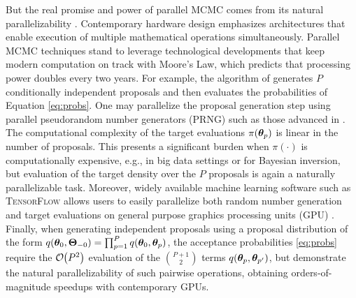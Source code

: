 \documentclass[12pt]{article} %
\newcommand{\order}[1]{{\cal O}\hspace{-0.2em}\left( #1 \right)}
\begin{document}
\begin{figure}[!t]
	\centering
\end{figure}

But the real promise and power of parallel MCMC comes from its natural parallelizability \citep{calderhead2014general}.  Contemporary hardware design emphasizes architectures that enable execution of multiple mathematical operations simultaneously. Parallel MCMC techniques stand to leverage technological developments that keep modern computation on track with Moore's Law, which predicts that processing power doubles every two years.  For example, the algorithm of \citet{tjelmeland2004using} generates $P$ conditionally independent proposals and then evaluates the probabilities of Equation \eqref{eq:probs}.  One may parallelize the proposal generation step using parallel pseudorandom number generators (PRNG) such as those advanced in \citet{salmon2011parallel}. The computational complexity of the target evaluations $\pi(\boldsymbol{\theta}_p)$ is linear in the number of proposals. This presents a significant burden when $\pi(\cdot)$ is computationally expensive, e.g., in big data settings or for Bayesian inversion, but evaluation of the target density over the $P$ proposals is again a naturally parallelizable task.  Moreover, widely available machine learning software such as \textsc{TensorFlow} allows users to easily parallelize both random number generation and target evaluations on general purpose graphics processing units (GPU) \citep{lao2020tfp}. Finally, when generating independent proposals using a proposal distribution of the form $q(\boldsymbol{\theta}_0,\boldsymbol{\Theta}_{-0})=\prod_{p=1}^Pq(\boldsymbol{\theta}_0,\boldsymbol{\theta}_{p})$, the acceptance probabilities \eqref{eq:probs} require the $\order{P^2}$ evaluation of the $P+1\choose 2$ terms $q(\boldsymbol{\theta}_{p},\boldsymbol{\theta}_{p'})$, but \citet{massive,holbrook2021scalable} demonstrate the natural parallelizability of such pairwise operations, obtaining orders-of-magnitude speedups with contemporary GPUs.
\end{document}
